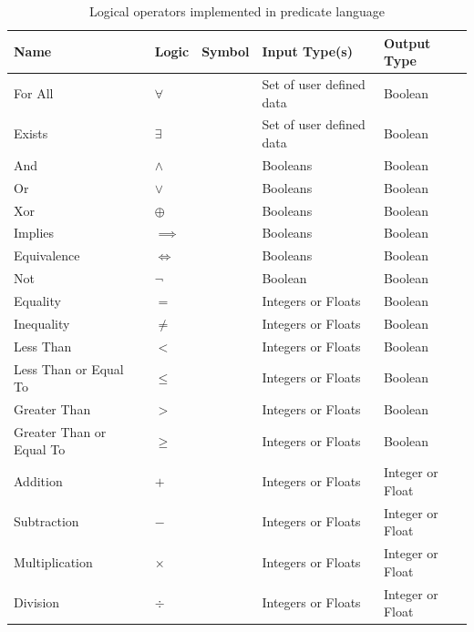 \begin{table}[H]
\centering
\begin{tabular}{| l | l | l | l | l |}
\hline
Name & Logic & Symbol & Input Type(s) & Output Type\\
\hline

For All & $\forall$ & \sm{@} & Set of user defined data & Boolean\\
Exists & $\exists$ & \sm{\#} & Set of user defined data & Boolean\\

\hline

And & $\land$ & \sm{\&} & Booleans & Boolean\\
Or & $\lor$ & \sm{\textbar} & Booleans & Boolean\\
Xor & $\oplus$ & \sm{\textasciicircum} & Booleans & Boolean\\
Implies & $\implies$ & \sm{=\textgreater} & Booleans & Boolean\\
Equivalence & $\iff$ & \sm{\textless=\textgreater} & Booleans & Boolean\\

\hline

Not & $\lnot$ & \sm{!} & Boolean & Boolean\\

\hline

Equality & $=$ & \sm{==} & Integers or Floats & Boolean\\
Inequality & $\not=$ & \sm{!=} & Integers or Floats & Boolean\\
Less Than & $<$ & \sm{\textless} & Integers or Floats & Boolean\\
Less Than or Equal To & $\leq$ & \sm{\textless=} & Integers or Floats & Boolean\\
Greater Than & $>$ & \sm{\textgreater} & Integers or Floats & Boolean\\
Greater Than or Equal To & $\geq$ & \sm{\textgreater=} & Integers or Floats & Boolean\\

\hline

Addition & $+$ & \sm{+} & Integers or Floats & Integer or Float\\
Subtraction & $-$ & \sm{-} & Integers or Floats & Integer or Float\\
Multiplication & $\times$ & \sm{*} & Integers or Floats & Integer or Float\\
Division & $\div$ & \sm{/} & Integers or Floats & Integer or Float\\

\hline
\end{tabular}
\caption{Logical operators implemented in predicate language}
\label{tab:lang-operators}
\end{table}

